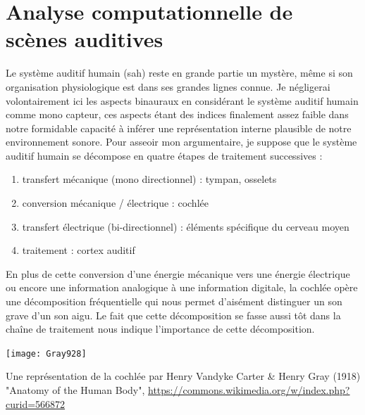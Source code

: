 
  \section{\nmu Analyse computationnelle de scènes auditives} \label{sec:asa}

  Le système auditif humain (sah) reste en grande partie un mystère, même si son organisation physiologique est dans ses grandes lignes connue. Je négligerai volontairement ici les aspects binauraux en considérant le système auditif humain comme mono capteur, ces aspects étant des indices finalement assez faible dans notre formidable capacité à inférer une représentation interne plausible de notre environnement sonore. Pour asseoir mon argumentaire, je suppose que le système auditif humain se décompose en quatre étapes de traitement successives :
  \begin{enumerate}
    \item transfert mécanique (mono directionnel) : tympan, osselets
    \item conversion mécanique / électrique : cochlée
    \item transfert électrique (bi-directionnel) : éléments spécifique du cerveau moyen
    \item traitement : cortex auditif
  \end{enumerate}

  En plus de cette conversion d'une énergie mécanique vers une énergie électrique ou encore une information analogique à une information digitale, la cochlée opère une décomposition fréquentielle qui nous permet d'aisément distinguer un son grave d'un son aigu. Le fait que cette décomposition se fasse aussi tôt dans la chaîne de traitement nous indique l'importance de cette décomposition.

  \begin{marginfigure}
    \texttt{[image: Gray928]}
    \caption{Une représentation de la cochlée par Henry Vandyke Carter \& Henry Gray (1918) "Anatomy of the Human Body", \url{https://commons.wikimedia.org/w/index.php?curid=566872}}
  \end{marginfigure}

